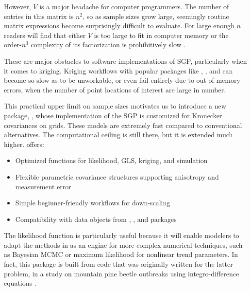 However, \(V\) is a major headache for computer programmers. The number of entries in this matrix is \(n^2\), so as sample sizes grow large, seemingly routine matrix expressions become surprisingly difficult to evaluate. For large enough \(n\) readers will find that either \(V\) is too large to fit in computer memory or the order-\(n^3\) complexity of its factorization is prohibitively slow \citep{lindgren2011explicit}.

These are major obstacles to software implementations of SGP, particularly when it comes to kriging. Kriging workflows with popular packages like  \citep{pebesma2004gstat, bivand2013applied}, , \citep{ribeiro1999splus, diggle2007model} and  \citep{nychka2021fields} can become so slow as to be unworkable, or even fail entirely due to out-of-memory errors, when the number of point locations of interest are large in number.

This practical upper limit on sample sizes motivates us to introduce a new package, , whose implementation of the SGP is customized for Kronecker covariances on grids. These models are extremely fast compared to conventional alternatives. The computational ceiling is still there, but it is extended much higher.  offers:

\begin{itemize}
\tightlist
\item
  Optimized functions for likelihood, GLS, kriging, and simulation
\item
  Flexible parametric covariance structures supporting anisotropy and measurement error
\item
  Simple beginner-friendly workflows for down-scaling
\item
  Compatibility with data objects from  \citep{hijmansraster},  \citep{hijmansterra}, and  \citep{pebesma2018sf} packages
\end{itemize}

The likelihood function is particularly useful because it will enable modelers to adapt the methods in  as an engine for more complex numerical techniques, such as Bayesian MCMC \citep{flaxman2015fast} or maximum likelihood for nonlinear trend parameters. In fact, this package is built from code that was originally written for the latter problem, in a study on mountain pine beetle outbreaks using integro-difference equations \citep{koch2020computationally}.

